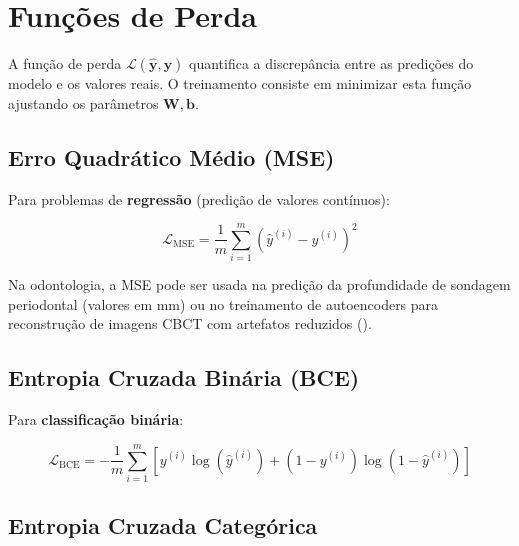 \section{Funções de Perda}
\label{sec:funcoes-perda}

A função de perda $\mathcal{L}(\mathbf{\hat{y}}, \mathbf{y})$ quantifica a discrepância
entre as predições do modelo e os valores reais. O treinamento consiste em minimizar
esta função ajustando os parâmetros $\mathbf{W}, \mathbf{b}$.

\subsection{Erro Quadrático Médio (MSE)}

Para problemas de \textbf{regressão} (predição de valores contínuos):

\begin{equation}
  \mathcal{L}_{\text{MSE}} = \frac{1}{m} \sum_{i=1}^{m} (\hat{y}^{(i)} - y^{(i)})^2
  \label{eq:mse}
\end{equation}

Na odontologia, a MSE pode ser usada na predição da profundidade de sondagem
periodontal (valores em mm) ou no treinamento de autoencoders para reconstrução
de imagens CBCT com artefatos reduzidos ().

\subsection{Entropia Cruzada Binária (BCE)}

Para \textbf{classificação binária}:

\begin{equation}
  \mathcal{L}_{\text{BCE}} = -\frac{1}{m} \sum_{i=1}^{m} \left[
    y^{(i)} \log(\hat{y}^{(i)}) + (1 - y^{(i)}) \log(1 - \hat{y}^{(i)})
  \right]
  \label{eq:bce}
\end{equation}


\subsection{Entropia Cruzada Categórica}

